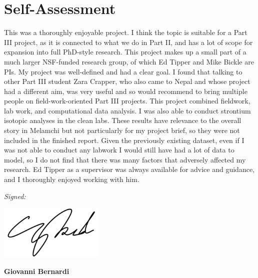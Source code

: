 \documentclass[hidelinks, 12pt]{article} %
\newcommand{\bsk}{\vspace{\baselineskip}}
\begin{document}


\thispagestyle{empty}


\section*{Self-Assessment}

This was a thoroughly enjoyable project. I think the topic is suitable for a Part III project, as it is connected to what we do in Part II, and has a lot of scope for expansion into full PhD-style research. This project makes up a small part of a much larger NSF-funded research group, of which Ed Tipper and Mike Bickle are PIs. My project was well-defined and had a clear goal. I found that talking to other Part III student Zara Crapper, who also came to Nepal and whose project had a different aim, was very useful and so would recommend to bring multiple people on field-work-oriented Part III projects. This project combined fieldwork, lab work, and computational data analysis. I was also able to conduct strontium isotopic analyses in the clean labs. These results have relevance to the overall story in Melamchi but not particularly for my project brief, so they were not included in the finished report. Given the previously existing dataset, even if I was not able to conduct any labwork I would still have had a lot of data to model, so I do not find that there was many factors that adversely affected my research. Ed Tipper as a supervisor was always available for advice and guidance, and I thoroughly enjoyed working with him.

\bsk

\hfill \textit{Signed:}\phantom{hellohel}
\vspace{0.5cm}
  \begin{flushright}
    \includegraphics[width=5cm]{signature.png} \\ 
  \end{flushright}
  \hfill \textbf{Giovanni Bernardi}\phantom{hel}
\end{document}
